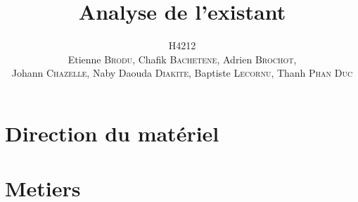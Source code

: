 \documentclass[a4paper,11pt]{report}
\title{Analyse de l'existant}
\author{H4212\\Etienne \textsc{Brodu}, Chafik \textsc{Bachetene}, Adrien \textsc{Brochot},\\Johann \textsc{Chazelle}, Naby Daouda \textsc{Diakite}, Baptiste \textsc{Lecornu}, Thanh \textsc{Phan Duc}}
\begin{document}
\maketitle
\newpage

\tableofcontents
\newpage

\chapter{Direction du matériel}
	
\chapter{Metiers}
	
\end{document}
